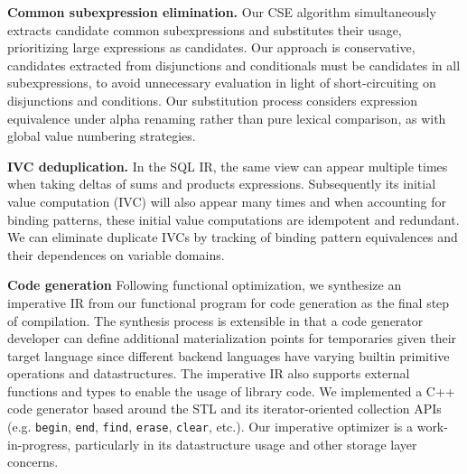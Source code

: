 \vspace{1mm}
\noindent\textbf{Common subexpression elimination.}
Our CSE algorithm simultaneously extracts candidate common subexpressions and
substitutes their usage, prioritizing large expressions as candidates. Our
approach is conservative, candidates extracted from disjunctions and
conditionals must be candidates in all subexpressions, to avoid unnecessary
evaluation in light of short-circuiting on disjunctions and conditions. Our
substitution process considers expression equivalence under alpha renaming
rather than pure lexical comparison, as with global value numbering strategies.

\vspace{1mm}
\noindent\textbf{IVC deduplication.} In the SQL IR, the same view can appear
multiple times when taking deltas of sums and products expressions. Subsequently
its initial value computation (IVC) will also appear many times and when
accounting for binding patterns, these initial value computations are idempotent
and redundant. We can eliminate duplicate IVCs by tracking of binding pattern
equivalences and their dependences on variable domains.




\noindent\textbf{Code generation} Following functional optimization, we
synthesize an imperative IR from our functional program for code generation as
the final step of compilation. The synthesis process is extensible in that a
code generator developer can define additional materialization points for
temporaries given their target language since different backend languages have
varying builtin primitive operations and datastructures. The imperative IR also
supports external functions and types to enable the usage of library code. We
implemented a C++ code generator based around the STL and its iterator-oriented
collection APIs (e.g. \texttt{begin}, \texttt{end}, \texttt{find},
\texttt{erase}, \texttt{clear}, etc.). Our imperative optimizer is a
work-in-progress, particularly in its datastructure usage and other storage
layer concerns.

